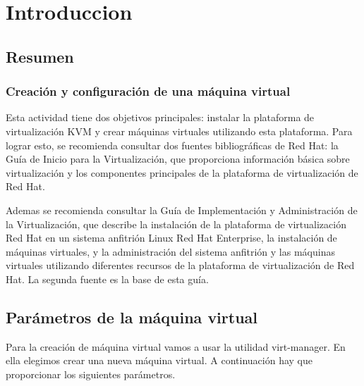 \chapter{Introduccion} %

\section{Resumen} %

\subsection*{Creación y configuración de una máquina virtual}
Esta actividad tiene dos objetivos principales: instalar la plataforma de virtualización KVM y crear máquinas virtuales utilizando esta plataforma. 
Para lograr esto, se recomienda consultar dos fuentes bibliográficas de Red Hat: la Guía de Inicio para la Virtualización, que proporciona información básica sobre virtualización y los componentes principales de la plataforma de virtualización de Red Hat.

Ademas se recomienda consultar la Guía de Implementación y Administración de la Virtualización, que describe la instalación de la plataforma de virtualización Red Hat en un sistema anfitrión Linux Red Hat Enterprise, la instalación de máquinas virtuales, y la administración del sistema anfitrión y las máquinas virtuales utilizando diferentes recursos de la plataforma de virtualización de Red Hat. La segunda fuente es la base de esta guía.


\section{Parámetros	de	la	máquina	virtual} %

Para la creación de máquina virtual vamos a usar la utilidad virt-manager. En ella elegimos crear una nueva máquina virtual. A continuación hay que proporcionar los siguientes parámetros. 

